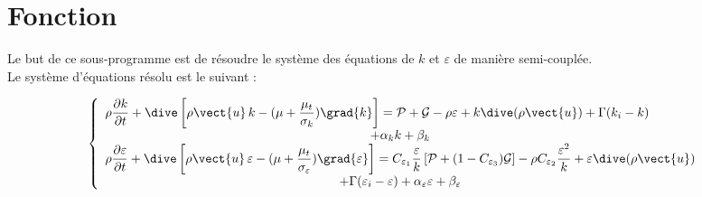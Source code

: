 
%
%
%
%


\label{ap:turbke}

\vspace{1cm}
\section*{Fonction}
Le but de ce sous-programme est de r\'esoudre le syst\`eme des \'equations de
$k$ et $\varepsilon$ de mani\`ere semi-coupl\'ee.\\
Le syst\`eme d'\'equations r\'esolu est le suivant :

\begin{equation}
\left\{\begin{array}{l}
\displaystyle
\rho\frac{\partial k}{\partial t} +
\dive\left[\rho \vect{u}\,k-(\mu+\frac{\mu_t}{\sigma_k})\grad{k}\right] =
\mathcal{P}+\mathcal{G}-\rho\varepsilon+k\dive(\rho\vect{u})
+\Gamma(k_i-k)\\
\multicolumn{1}{c}{+\alpha_k k +\beta_k}\\
\displaystyle
\rho\frac{\partial \varepsilon}{\partial t} +
\dive\left[\rho \vect{u}\,\varepsilon-
(\mu+\frac{\mu_t}{\sigma_\varepsilon})\grad{\varepsilon}\right] =
C_{\varepsilon_1}\frac{\varepsilon}{k}\left[\mathcal{P}
+(1-C_{\varepsilon_3})\mathcal{G}\right]
-\rho C_{\varepsilon_2}\frac{\varepsilon^2}{k}
+\varepsilon\dive(\rho\vect{u})\\
\multicolumn{1}{c}{+\Gamma(\varepsilon_i-\varepsilon)
+\alpha_\varepsilon \varepsilon +\beta_\varepsilon}
\end{array}\right.
\end{equation}

